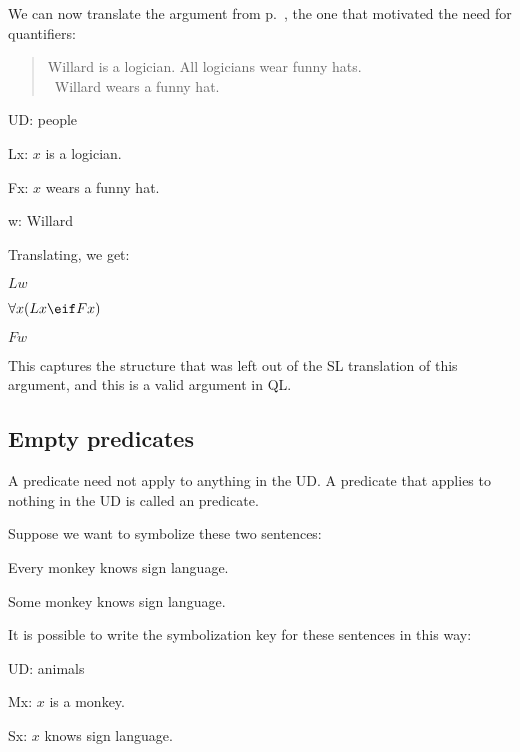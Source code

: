 We can now translate the argument from p.~\pageref{willard1}, the one that motivated the need for quantifiers:
\begin{quote}
Willard is a logician. All logicians wear funny hats.\\
\therefore\ Willard wears a funny hat.
\end{quote}
\begin{ekey}
\item[UD:] people
\item[Lx:] $x$ is a logician.
\item[Fx:] $x$ wears a funny hat.
\item[w:] Willard
\end{ekey}
Translating, we get:
\begin{earg}
\item[] $Lw$
\item[] $\forall x(Lx \eif Fx)$
\item[\therefore] $Fw$
\end{earg}

This captures the structure that was left out of the SL translation of this argument, and this is a valid argument in QL.









\subsection{Empty predicates}
A predicate need not apply to anything in the UD. A predicate that applies to nothing in the UD is called an  predicate.

Suppose we want to symbolize these two sentences:
\begin{earg}
\item[\ex{monkey1}]Every monkey knows sign language.
\item[\ex{monkey2}]Some monkey knows sign language.
\end{earg}
It is possible to write the symbolization key for these sentences in this way:
\begin{ekey}
\item[UD:] animals
\item[Mx:] $x$ is a monkey.
\item[Sx:] $x$ knows sign language.
\end{ekey}

